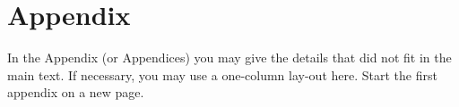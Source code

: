 
\section{Appendix}\label{ap:appendix}
In the Appendix (or Appendices) you may give the details that did not fit in the main text.
If necessary, you may use a one-column lay-out here.
Start the first appendix on a new page.
